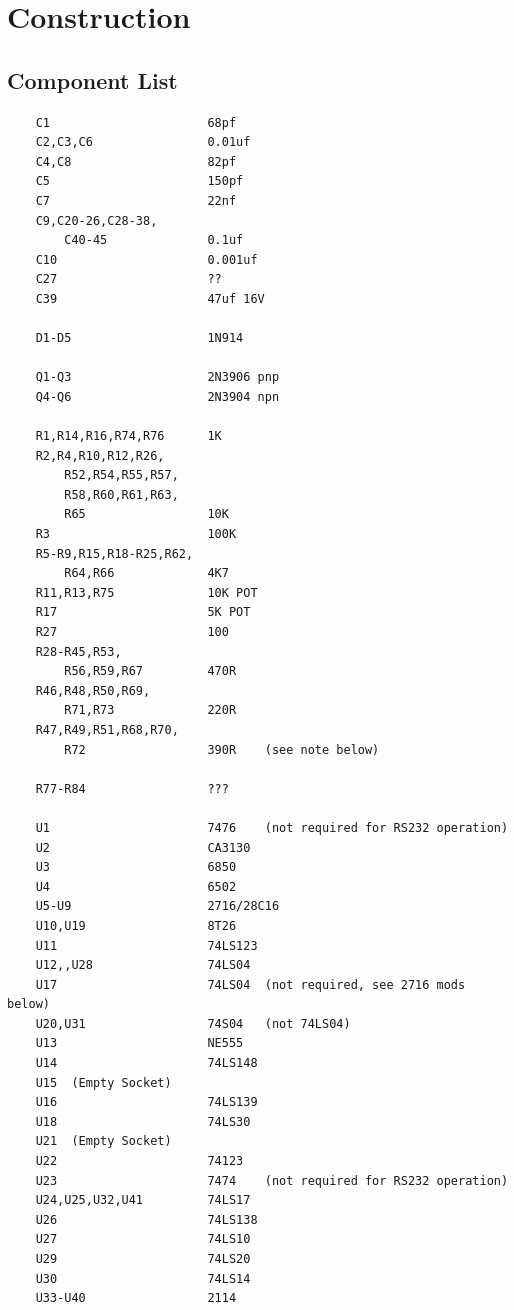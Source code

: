 \chapter{Construction}

\section{Component List}

\begin{verbatim}
    C1                      68pf
    C2,C3,C6                0.01uf
    C4,C8                   82pf    
    C5                      150pf 
    C7                      22nf    
    C9,C20-26,C28-38,
        C40-45              0.1uf        
    C10                     0.001uf
    C27                     ??
    C39                     47uf 16V

    D1-D5                   1N914 
    
    Q1-Q3                   2N3906 pnp 
    Q4-Q6                   2N3904 npn 
    
    R1,R14,R16,R74,R76      1K
    R2,R4,R10,R12,R26,
        R52,R54,R55,R57,
        R58,R60,R61,R63,
        R65                 10K     
    R3                      100K 
    R5-R9,R15,R18-R25,R62,
        R64,R66             4K7 
    R11,R13,R75             10K POT 
    R17                     5K POT 
    R27                     100
    R28-R45,R53,
        R56,R59,R67         470R 
    R46,R48,R50,R69,
        R71,R73             220R 
    R47,R49,R51,R68,R70,
        R72                 390R    (see note below)

    R77-R84                 ???
    
    U1                      7476    (not required for RS232 operation)
    U2                      CA3130 
    U3                      6850 
    U4                      6502 
    U5-U9                   2716/28C16 
    U10,U19                 8T26
    U11                     74LS123
    U12,,U28                74LS04
    U17                     74LS04  (not required, see 2716 mods below)
    U20,U31                 74S04   (not 74LS04)
    U13                     NE555 
    U14                     74LS148 
    U15  (Empty Socket)
    U16                     74LS139 
    U18                     74LS30 
    U21  (Empty Socket)
    U22                     74123
    U23                     7474    (not required for RS232 operation) 
    U24,U25,U32,U41         74LS17 
    U26                     74LS138 
    U27                     74LS10 
    U29                     74LS20 
    U30                     74LS14 
    U33-U40                 2114 
\end{verbatim}

